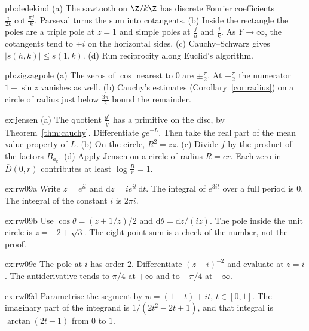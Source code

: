 \begin{hint}{pb:dedekind}
(a) The sawtooth on $\Z/k\Z$ has discrete Fourier coefficients $\frac i{2k}\cot\frac{\pi j}k$. Parseval turns the sum into cotangents. (b) Inside the rectangle the poles are a triple pole at $z=1$ and simple poles at $\frac jh$ and $\frac jk$. As $Y\to\infty$, the cotangents tend to $\mp i$ on the horizontal sides. (c) Cauchy--Schwarz gives $|s(h,k)|\le s(1,k)$. (d) Run reciprocity along Euclid's algorithm.
\end{hint}

\begin{hint}{pb:zigzagpole}
(a) The zeros of $\cos$ nearest to $0$ are $\pm\frac\pi2$. At $-\frac\pi2$ the numerator $1+\sin z$ vanishes as well. (b) Cauchy's estimates (Corollary~\ref{cor:radius}) on a circle of radius just below $\frac{3\pi}2$ bound the remainder.
\end{hint}

\begin{hint}{ex:jensen}
(a) The quotient $\frac{g'}g$ has a primitive on the disc, by Theorem~\ref{thm:cauchy}. Differentiate $ge^{-L}$. Then take the real part of the mean value property of $L$. (b) On the circle, $R^2=z\overline z$. (c) Divide $f$ by the product of the factors $B_{a_k}$. (d) Apply Jensen on a circle of radius $R=er$. Each zero in $\overline D(0,r)$ contributes at least $\log\frac Rr=1$.
\end{hint}

\begin{hint}{ex:rw09a}
Write $z=e^{it}$ and $\mathrm dz=ie^{it}\,\mathrm dt$. The integral of $e^{3it}$ over a full period is $0$. The integral of the constant $i$ is $2\pi i$.
\end{hint}
\begin{hint}{ex:rw09b}
Use $\cos\theta=(z+1/z)/2$ and $\mathrm d\theta=\mathrm dz/(iz)$. The pole inside the unit circle is $z=-2+\sqrt3$. The eight-point sum is a check of the number, not the proof.
\end{hint}
\begin{hint}{ex:rw09c}
The pole at $i$ has order $2$. Differentiate $(z+i)^{-2}$ and evaluate at $z=i$. The antiderivative tends to $\pi/4$ at $+\infty$ and to $-\pi/4$ at $-\infty$.
\end{hint}
\begin{hint}{ex:rw09d}
Parametrise the segment by $w=(1-t)+it$, $t\in[0,1]$. The imaginary part of the integrand is $1/(2t^2-2t+1)$, and that integral is $\arctan(2t-1)$ from $0$ to $1$.
\end{hint}

